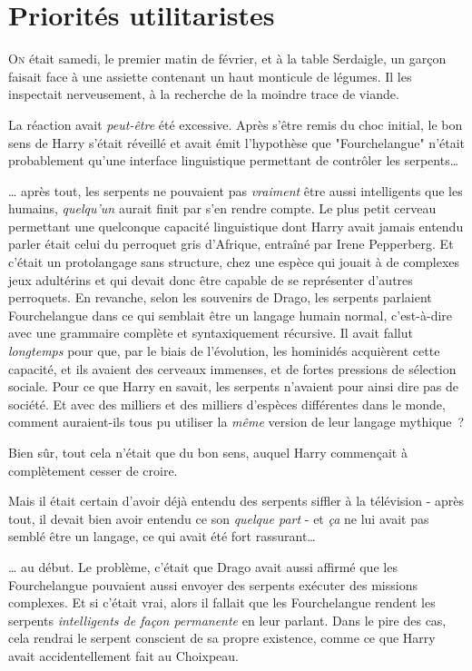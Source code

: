 \chapter{Priorités utilitaristes}

\lettrine{O}{n} était samedi, le premier matin de février, et à la table Serdaigle, un garçon faisait face à une assiette contenant un haut monticule de légumes. Il les inspectait nerveusement, à la recherche de la moindre trace de viande.

La réaction avait \emph{peut-être} été excessive. Après s'être remis du choc initial, le bon sens de Harry s'était réveillé et avait émit l'hypothèse que "Fourchelangue" n'était probablement qu'une interface linguistique permettant de contrôler les serpents…

… après tout, les serpents ne pouvaient pas \emph{vraiment} être aussi intelligents que les humains, \emph{quelqu'un} aurait finit par s'en rendre compte. Le plus petit cerveau permettant une quelconque capacité linguistique dont Harry avait jamais entendu parler était celui du perroquet gris d'Afrique, entraîné par Irene Pepperberg. Et c'était un protolangage sans structure, chez une espèce qui jouait à de complexes jeux adultérins et qui devait donc être capable de se représenter d'autres perroquets. En revanche, selon les souvenirs de Drago, les serpents parlaient Fourchelangue dans ce qui semblait être un langage humain normal, c'est-à-dire avec une grammaire complète et syntaxiquement récursive. Il avait fallut \emph{longtemps} pour que, par le biais de l'évolution, les hominidés acquièrent cette capacité, et ils avaient des cerveaux immenses, et de fortes pressions de sélection sociale. Pour ce que Harry en savait, les serpents n'avaient pour ainsi dire pas de société. Et avec des milliers et des milliers d'espèces différentes dans le monde, comment auraient-ils tous pu utiliser la \emph{même} version de leur langage mythique~?

Bien sûr, tout cela n'était que du bon sens, auquel Harry commençait à complètement cesser de croire.

Mais il était certain d'avoir déjà entendu des serpents siffler à la télévision - après tout, il devait bien avoir entendu ce son \emph{quelque part} - et \emph{ça} ne lui avait pas semblé être un langage, ce qui avait été fort rassurant…

… au début. Le problème, c'était que Drago avait aussi affirmé que les Fourchelangue pouvaient aussi envoyer des serpents exécuter des missions complexes. Et si c'était vrai, alors il fallait que les Fourchelangue rendent les serpents \emph{intelligents de façon permanente} en leur parlant. Dans le pire des cas, cela rendrai le serpent conscient de sa propre existence, comme ce que Harry avait accidentellement fait au Choixpeau.

